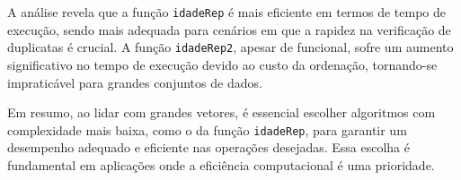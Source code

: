 A análise revela que a função \texttt{idadeRep} é mais eficiente em termos de tempo de execução, sendo mais adequada para cenários em que a rapidez na verificação de duplicatas é crucial. A função \texttt{idadeRep2}, apesar de funcional, sofre um aumento significativo no tempo de execução devido ao custo da ordenação, tornando-se impraticável para grandes conjuntos de dados.

Em resumo, ao lidar com grandes vetores, é essencial escolher algoritmos com complexidade mais baixa, como o da função \texttt{idadeRep}, para garantir um desempenho adequado e eficiente nas operações desejadas. Essa escolha é fundamental em aplicações onde a eficiência computacional é uma prioridade.


